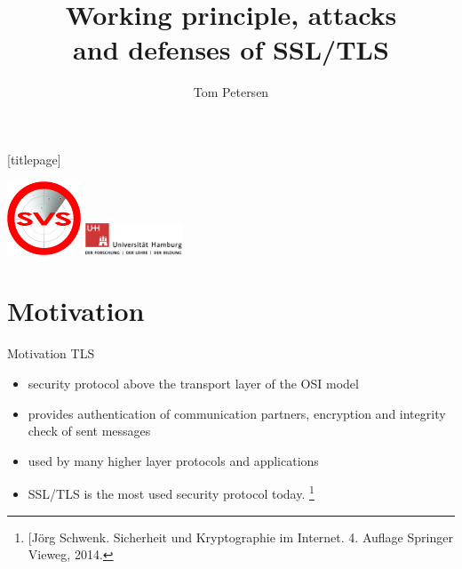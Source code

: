 


\title{Working principle, attacks\\ and defenses of SSL/TLS}
\author[Tom Petersen]{Tom Petersen}
\date{}%



\begingroup
	[titlepage]
	\begin{frame}[plain]
		\vskip8mm
		\includegraphics[width=2.2cm]{pic/svs_logo_hires-ohne-was.png}
		 \vskip-20mm %
		\titlepage
		\vspace{\fill}
		\includegraphics[width=2.9cm]{pic/UHH-Logo_2010_Farbe_RGB_hires_nomargin.png}
		\vskip20pt
	\end{frame}
\endgroup


\section{Motivation}

\begin{frame}{Motivation TLS}

\begin{itemize}
\item security protocol above the transport layer of the OSI model

\item provides authentication of communication partners, encryption and integrity check of sent messages

\item used by many higher layer protocols and applications 

\item SSL/TLS is the most used security protocol today. \footnote{[Jörg Schwenk. Sicherheit und Kryptographie im Internet. 4. Auflage Springer Vieweg, 2014.}
\end{itemize}

%
%

\end{frame}

